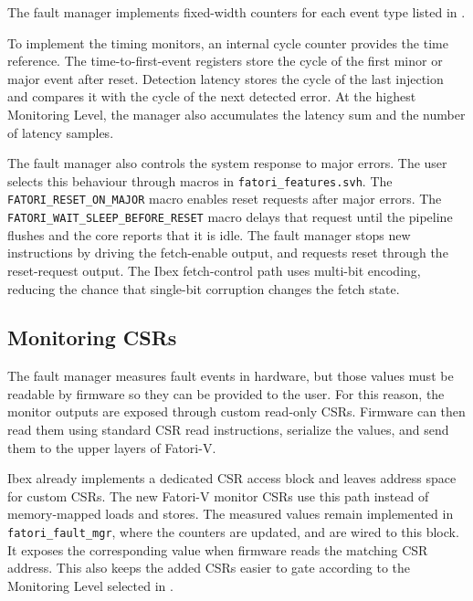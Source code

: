 The fault manager implements fixed-width counters for each event type listed in .

To implement the timing monitors, an internal cycle counter provides the time reference. The time-to-first-event registers store the cycle of the first minor or major event after reset. Detection latency stores the cycle of the last injection and compares it with the cycle of the next detected error. At the highest Monitoring Level, the manager also accumulates the latency sum and the number of latency samples.

The fault manager also controls the system response to major errors. The user selects this behaviour through macros in \texttt{fatori\_features.svh}. The \texttt{FATORI\_RESET\_ON\_MAJOR} macro enables reset requests after major errors. The \texttt{FATORI\_WAIT\_SLEEP\_BEFORE\_RESET} macro delays that request until the pipeline flushes and the core reports that it is idle. The fault manager stops new instructions by driving the fetch-enable output, and requests reset through the reset-request output. The Ibex fetch-control path uses multi-bit encoding, reducing the chance that single-bit corruption changes the fetch state.







\subsection{Monitoring CSRs}
\label{chap6:metrics_hw}

The fault manager measures fault events in hardware, but those values must be readable by firmware so they can be provided to the user. For this reason, the monitor outputs are exposed through custom read-only \acp{CSR}. Firmware can then read them using standard CSR read instructions, serialize the values, and send them to the upper layers of \ac{Fatori-V}.

Ibex already implements a dedicated \ac{CSR} access block and leaves address space for custom \acp{CSR}. The new \ac{Fatori-V} monitor \acp{CSR} use this path instead of memory-mapped loads and stores. The measured values remain implemented in \texttt{fatori\_fault\_mgr}, where the counters are updated, and are wired to this block. It exposes the corresponding value when firmware reads the matching \ac{CSR} address. This also keeps the added \acp{CSR} easier to gate according to the Monitoring Level selected in .

